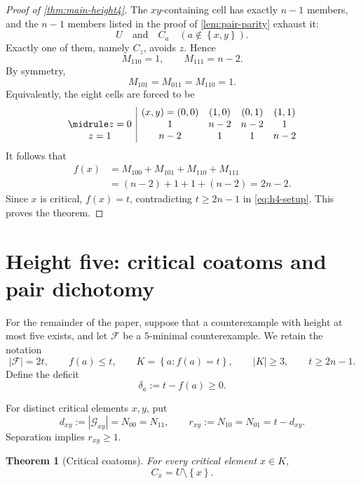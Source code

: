 \documentclass[11pt,reqno]{amsart}
\numberwithin{equation}{section}
\newtheorem{theorem}{Theorem}[section]
\theoremstyle{definition}
\theoremstyle{remark}
\newcommand{\F}{\mathcal{F}}
\newcommand{\G}{\mathcal{G}}
\newcommand{\1}{\mathbf{1}}
\newcommand{\set}[1]{\left\{#1\right\}}
\newcommand{\abs}[1]{\left|#1\right|}
\begin{document}
\begin{proof}[Proof of \cref{thm:main-height4}]
The \(xy\)-containing cell has exactly \(n-1\) members, and the \(n-1\) members listed in the proof of \cref{lem:pair-parity} exhaust it:
\[
U
\quad\text{and}\quad
C_a\quad(a\notin\set{x,y}).
\]
Exactly one of them, namely \(C_z\), avoids \(z\).  Hence
\[
M_{110}=1,
\qquad
M_{111}=n-2.
\]
By symmetry,
\begin{equation}\label{eq:upper-cube}
M_{101}=M_{011}=M_{110}=1.
\end{equation}
Equivalently, the eight cells are forced to be
\[
\begin{array}{c|cccc}
 & (x,y)=(0,0) & (1,0) & (0,1) & (1,1)\\
\midrule
z=0 & 1 & n-2 & n-2 & 1\\
z=1 & n-2 & 1 & 1 & n-2
\end{array}
\]
It follows that
\[
\begin{aligned}
f(x)
&=M_{100}+M_{101}+M_{110}+M_{111}\\
&=(n-2)+1+1+(n-2)=2n-2.
\end{aligned}
\]
Since \(x\) is critical, \(f(x)=t\), contradicting \(t\ge2n-1\) in \cref{eq:h4-setup}.  This proves the theorem.
\end{proof}

\section{Height five: critical coatoms and pair dichotomy}

For the remainder of the paper, suppose that a counterexample with height at most five exists, and let \(\F\) be a \(5\)-minimal counterexample.  We retain the notation
\begin{equation}\label{eq:h5-setup}
\abs{\F}=2t,
\qquad
f(a)\le t,
\qquad
K=\set{a:f(a)=t},
\qquad
\abs{K}\ge3,
\qquad
 t\ge2n-1.
\end{equation}
Define the deficit
\begin{equation}\label{eq:deficit}
\delta_a:=t-f(a)\ge0.
\end{equation}

For distinct critical elements \(x,y\), put
\begin{equation}\label{eq:d-r}
d_{xy}:=\abs{\G_{xy}}=N_{00}=N_{11},
\qquad
r_{xy}:=N_{10}=N_{01}=t-d_{xy}.
\end{equation}
Separation implies \(r_{xy}\ge1\).

\begin{theorem}[Critical coatoms]\label{thm:critical-coatom}
For every critical element \(x\in K\),
\begin{equation}\label{eq:critical-coatom}
\boxed{C_x=U\setminus\set{x}.}
\end{equation}
\end{theorem}
\end{document}
